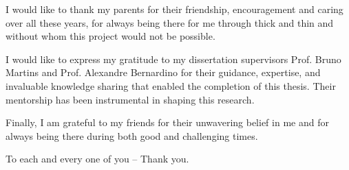 
I would like to thank my parents for their friendship, encouragement and caring over all these years, for always being there for me through thick and thin and without whom this project would not be possible.

I would like to express my gratitude to my dissertation supervisors Prof. Bruno Martins and Prof. Alexandre Bernardino for their guidance, expertise, and invaluable knowledge sharing that enabled the completion of this thesis. Their mentorship has been instrumental in shaping this research.

Finally, I am grateful to my friends for their unwavering belief in me and for always being there during both good and challenging times.

To each and every one of you -- Thank you.